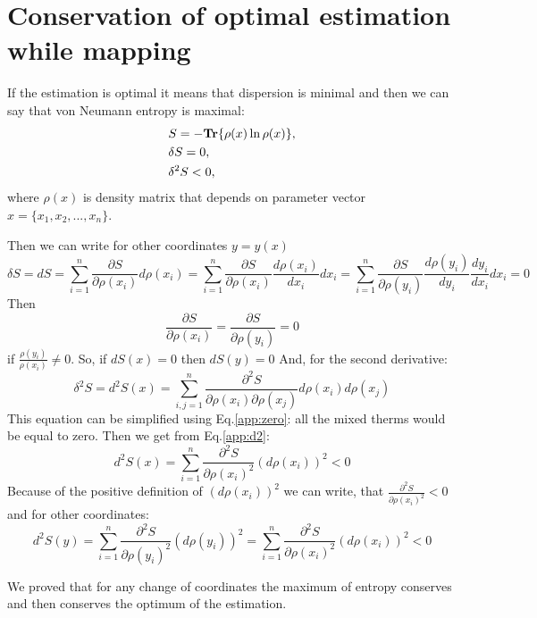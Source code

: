 \appendix
\section{Conservation of optimal estimation while mapping}\label{Appendix 1}
If the estimation is optimal it means that dispersion is minimal and then we can say that von Neumann entropy is maximal:
\begin{align}
& S = -\textbf{Tr}\{\rho(x) \ln \rho(x)\}, \\
& \delta S = 0, \\
& \delta^2 S <0,
\end{align}
where $\rho(x)$ is density matrix that depends on parameter vector $x = \{x_1,x_2,...,x_n\}$.

Then we can write for other coordinates $y=y(x)$
\begin{equation}
 \delta S = dS = \sum\limits_{i=1}^n \frac{\partial S}{\partial \rho(x_i)}d\rho(x_i)=\sum\limits_{i=1}^n \frac{\partial S}{\partial \rho(x_i)}\frac{d \rho(x_i)}{d x_i}dx_i =\sum\limits_{i=1}^n \frac{\partial S}{\partial \rho(y_i)}\frac{d \rho(y_i)}{d y_i}\frac{d y_i}{d x_i}dx_i =0
\end{equation}
Then 
\begin{equation}\label{app:zero}
\frac{\partial S}{\partial \rho(x_i)} = \frac{\partial S}{\partial \rho(y_i)} = 0
\end{equation}
if $\frac{\rho(y_i)}{\rho(x_i)}\neq0$. So, if $dS(x)=0$ then $dS(y)=0$
And, for the second derivative:
\begin{equation}\label{app:d2}
 \delta^2 S = d^2 S(x) = \sum\limits_{i,j=1}^n \frac{\partial^2 S}{\partial \rho(x_i) \partial \rho(x_j)}d\rho(x_i)d\rho(x_j)
\end{equation}
This equation can be simplified using Eq.\ref{app:zero}: all the mixed therms would be equal to zero.
Then we get from Eq.\ref{app:d2}:
\begin{equation}
 d^2 S(x) = \sum\limits_{i=1}^n \frac{\partial^2 S}{\partial \rho(x_i)^2 }(d\rho(x_i))^2<0
\end{equation}
Because of the positive definition of $(d\rho(x_i))^2$ we can write, that $\frac{\partial^2 S}{\partial \rho(x_i)^2 } < 0$ and for other coordinates:
\begin{equation}
 d^2 S(y) = \sum\limits_{i=1}^n \frac{\partial^2 S}{\partial \rho(y_i)^2 }(d\rho(y_i))^2 = \sum\limits_{i=1}^n \frac{\partial^2 S}{\partial \rho(x_i)^2 }(d\rho(x_i))^2 <0
\end{equation}

We proved that for any change of coordinates the maximum of entropy conserves and then conserves the optimum of the estimation.
